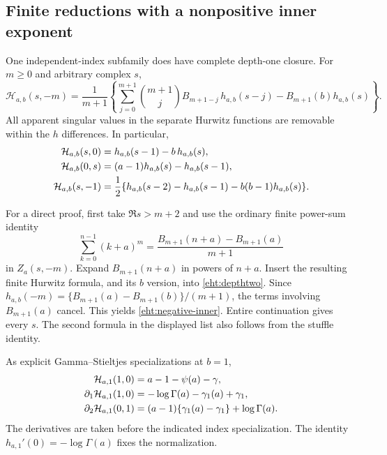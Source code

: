 \documentclass[11pt]{article}
\numberwithin{equation}{section}
\theoremstyle{plain}
\theoremstyle{definition}
\theoremstyle{remark}
\begin{document}
\subsection{Finite reductions with a nonpositive inner exponent}

One independent-index subfamily does have complete depth-one closure.
For $m\ge0$ and arbitrary complex $s$,
\begin{equation}\label{eht:negative-inner}
 \boxed{\mathcal H_{a,b}(s,-m)=\frac1{m+1}
 \left\{\sum_{j=0}^{m+1}\binom{m+1}{j}B_{m+1-j}\,
                       h_{a,b}(s-j)
          -B_{m+1}(b)h_{a,b}(s)\right\}.}
\end{equation}
All apparent singular values in the separate Hurwitz functions are
removable within the $h$ differences.  In particular,
\begin{align}
 \mathcal H_{a,b}(s,0)&=h_{a,b}(s-1)-b\,h_{a,b}(s),
        \label{eht:zero-inner}\\
 \mathcal H_{a,b}(0,s)&=(a-1)h_{a,b}(s)-h_{a,b}(s-1),\notag\\
 \mathcal H_{a,b}(s,-1)&=\frac12\{h_{a,b}(s-2)-h_{a,b}(s-1)
                                -b(b-1)h_{a,b}(s)\}.\notag
\end{align}

For a direct proof, first take $\Re s>m+2$ and use the ordinary finite
power-sum identity
\[
 \sum_{k=0}^{n-1}(k+a)^m
       =\frac{B_{m+1}(n+a)-B_{m+1}(a)}{m+1}
\]
in $Z_a(s,-m)$.  Expand $B_{m+1}(n+a)$ in powers of $n+a$.
Insert the resulting finite Hurwitz formula, and its $b$ version, into
\eqref{eht:depthtwo}.  Since
$h_{a,b}(-m)=\{B_{m+1}(a)-B_{m+1}(b)\}/(m+1)$, the terms involving
$B_{m+1}(a)$ cancel.  This yields \eqref{eht:negative-inner}.  Entire
continuation gives every $s$.  The second formula in the displayed list
also follows from the stuffle identity.

As explicit Gamma--Stieltjes specializations at $b=1$,
\begin{align}
 \mathcal H_{a,1}(1,0)&=a-1-\psi(a)-\gamma,\notag\\
 \partial_1\mathcal H_{a,1}(1,0)
   &=-\log\Gamma(a)-\gamma_1(a)+\gamma_1,\label{eht:Gamma-Stieltjes}\\
 \partial_2\mathcal H_{a,1}(0,1)
   &=(a-1)\{\gamma_1(a)-\gamma_1\}+\log\Gamma(a).\notag
\end{align}
The derivatives are taken before the indicated index specialization.
The identity $h_{a,1}'(0)=-\log\Gamma(a)$ fixes the normalization.
\end{document}
